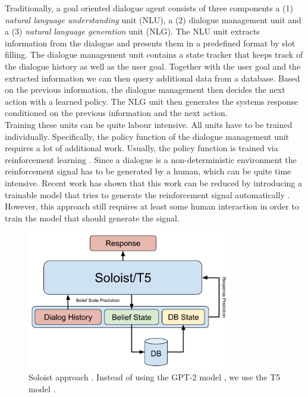 \documentclass[twocolumn]{tum-article}
\begin{document}
Traditionally, a goal oriented dialogue agent consists of three components a (1) \textit{natural language understanding} unit (NLU), a (2) dialogue management unit and a (3) \textit{natural language generation} unit (NLG). The NLU unit extracts information from the dialogue and presents them in a predefined format by slot filling. The dialogue management unit contains a state tracker that keeps track of the dialogue history as well as the user goal. Together with the user goal and the extracted information we can then query additional data from a database. Based on the previous information, the dialogue management then decides the next action with a learned policy. The NLG unit then generates the systems response conditioned on the previous information and the next action.\\
Training these units can be quite labour intensive. All units have to be trained individually. Specifically, the policy function of the dialogue management unit requires a lot of additional work. Usually, the policy function is trained via reinforcement learning \cite{DBLP:journals/ml/Williams92}. Since a dialogue is a non-deterministic environment the reinforcement signal has to be generated by a human, which can be quite time intensive. Recent work has shown that this work can be reduced by introducing a trainable model that tries to generate the reinforcement signal automatically \cite{DBLP:journals/corr/abs-1907-00448}. However, this approach still requires at least some human interaction in order to train the model that should generate the signal.\\
\begin{figure}[!h]
\centering
\includegraphics[width=0.8\textwidth]{figures/Soloist.png}
\caption{Soloist approach \cite{peng2020soloist}. Instead of using the GPT-2 model \cite{radford2019language}, we use the T5 model \cite{raffel2019exploring}.}
\label{fig:soloist}
\end{figure}
\end{document}
